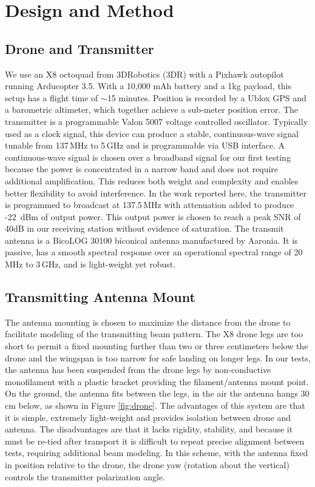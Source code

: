 \documentclass[preprint2,numberedappendix,tighten,twocolappendix]{aastex6}
\begin{document}
\section{Design and Method}
\label{sec:design}

\subsection{Drone and Transmitter}
We use an X8 octoquad from 3DRobotics (3DR) with a Pixhawk autopilot running Arducopter 3.5.  With a 10,000 mAh battery and a 1kg payload, this setup has a flight time of $\sim$15 minutes. Position is recorded by a Ublox GPS and a barometric altimeter, which together achieve a sub-meter position error.  The transmitter is a programmable Valon 5007 voltage controlled oscillator. Typically used as a clock signal, this device can produce a stable, continuous-wave signal tunable from 137\,MHz to 5\,GHz and is programmable via USB interface.  A continuous-wave signal is chosen over a broadband signal for our first testing because the power is concentrated in a narrow band and does not require additional amplification. This reduces both weight and complexity and enables better flexibility to avoid interference.  In the work reported here, the transmitter is programmed to broadcast at 137.5\,MHz with attenuation added to produce -22~dBm of output power.  This output power is chosen to reach a peak SNR of 40dB in our receiving station without evidence of saturation.  The transmit antenna is a BicoLOG 30100 biconical antenna manufactured by Aaronia. It is passive, has a smooth spectral response over an operational spectral range of 20\,MHz to 3\,GHz, and is light-weight yet robust. 


\subsection{Transmitting Antenna Mount}

The antenna mounting is chosen to maximize the distance from the drone to facilitate modeling of the transmitting beam pattern. The X8 drone legs are too short to permit a fixed mounting further than two or three centimeters below the drone and the wingspan is too narrow for safe landing on longer legs. In our tests, the antenna has been suspended from the drone legs by non-conductive monofilament with a plastic bracket providing the filament/antenna mount point. On the ground, the antenna fits between the legs, in the air the antenna hangs 30\,cm below, as shown in Figure \ref{fig:drone}. The advantages of this system are that it is simple, extremely light-weight and provides isolation between drone and antenna. The disadvantages are that it lacks rigidity, stability, and because it must be re-tied after transport it is difficult to repeat precise alignment between tests, requiring additional beam modeling.  In this scheme, with the antenna fixed in position relative to the drone, the drone yaw (rotation about the vertical) controls the transmitter polarization angle. 
\end{document}
